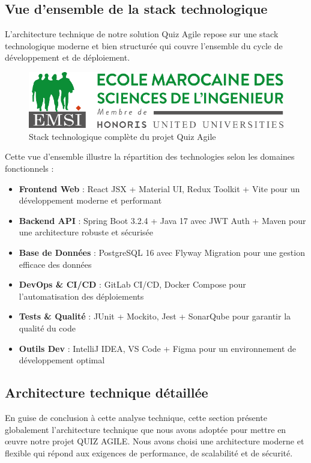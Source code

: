 \documentclass[12pt,a4paper]{report}
\begin{document}
\subsection{Vue d'ensemble de la stack technologique}

L'architecture technique de notre solution Quiz Agile repose sur une stack technologique moderne et bien structurée qui couvre l'ensemble du cycle de développement et de déploiement.

\begin{figure}[H]
\centering
\includegraphics[width=1.0\textwidth]{latex_media/media/stack_technologique_quiz_agile.png}
\caption{Stack technologique complète du projet Quiz Agile}
\label{fig:stack-technologique}
\end{figure}

Cette vue d'ensemble illustre la répartition des technologies selon les domaines fonctionnels :

\begin{itemize}
\item \textbf{Frontend Web} : React JSX + Material UI, Redux Toolkit + Vite pour un développement moderne et performant
\item \textbf{Backend API} : Spring Boot 3.2.4 + Java 17 avec JWT Auth + Maven pour une architecture robuste et sécurisée
\item \textbf{Base de Données} : PostgreSQL 16 avec Flyway Migration pour une gestion efficace des données
\item \textbf{DevOps \& CI/CD} : GitLab CI/CD, Docker Compose pour l'automatisation des déploiements
\item \textbf{Tests \& Qualité} : JUnit + Mockito, Jest + SonarQube pour garantir la qualité du code
\item \textbf{Outils Dev} : IntelliJ IDEA, VS Code + Figma pour un environnement de développement optimal
\end{itemize}

\subsection{Architecture technique détaillée}

En guise de conclusion à cette analyse technique, cette section présente globalement l'architecture technique que nous avons adoptée pour mettre en œuvre notre projet QUIZ AGILE. Nous avons choisi une architecture moderne et flexible qui répond aux exigences de performance, de scalabilité et de sécurité.
\end{document}
